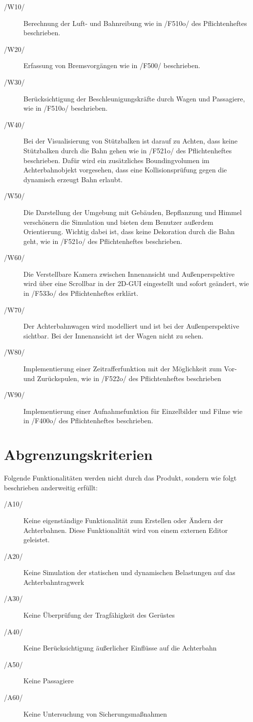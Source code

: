 \begin{description}
	\item[/W10/] Berechnung der Luft- und Bahnreibung wie in /F510o/ des Pflichtenheftes beschrieben.
	\item[/W20/] Erfassung von Bremsvorgängen wie in /F500/ beschrieben.
	\item[/W30/] Berücksichtigung der Beschleunigungskräfte durch Wagen und Passagiere, wie in /F510o/ beschrieben.
	\item[/W40/] Bei der Visualisierung von Stützbalken ist darauf zu Achten, dass keine Stützbalken durch die Bahn gehen wie in /F521o/ des Pflichtenheftes beschrieben. Dafür wird ein zusätzliches Boundingvolumen im Achterbahnobjekt vorgesehen, dass eine Kollisionsprüfung gegen die dynamisch erzeugt Bahn erlaubt.
	\item[/W50/] Die Darstellung der Umgebung mit Gebäuden, Bepflanzung und Himmel verschönern die Simulation und bieten dem Benutzer außerdem Orientierung. Wichtig dabei ist, dass keine Dekoration durch die Bahn geht, wie in /F521o/ des Pflichtenheftes beschrieben. 
	\item[/W60/] Die Verstellbare Kamera zwischen Innenansicht und Außenperspektive wird über eine Scrollbar in der 2D-GUI eingestellt und sofort geändert, wie in /F533o/ des Pflichtenheftes erklärt.
	\item[/W70/] Der Achterbahnwagen wird modelliert und ist bei der Außenperspektive sichtbar. Bei der Innenansicht ist der Wagen nicht zu sehen.
	\item[/W80/] Implementierung einer Zeitrafferfunktion mit der Möglichkeit zum Vor- und Zurückspulen, wie in /F522o/ des Pflichtenheftes beschrieben
	\item[/W90/] Implementierung einer Aufnahmefunktion für Einzelbilder und Filme wie in /F400o/ des Pflichtenheftes beschrieben.
\end{description}

\section{Abgrenzungskriterien}
Folgende Funktionalitäten werden nicht durch das Produkt, sondern wie folgt
beschrieben anderweitig erfüllt:
\begin{description}
	\item[/A10/] Keine eigenständige Funktionalität zum Erstellen oder Ändern der Achterbahnen. Diese Funktionalität wird von einem externen Editor geleistet.
	\item[/A20/] Keine Simulation der statischen und dynamischen Belastungen auf das Achterbahntragwerk
	\item[/A30/] Keine Überprüfung der Tragfähigkeit des Gerüstes
	\item[/A40/] Keine Berücksichtigung äußerlicher Einflüsse auf die Achterbahn
	\item[/A50/] Keine Passagiere
	\item[/A60/] Keine Untersuchung von Sicherungsmaßnahmen
\end{description}